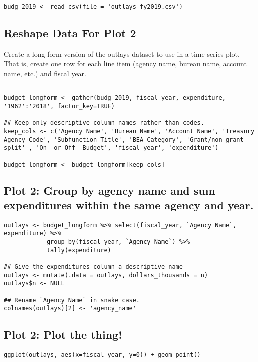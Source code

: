 \documentclass[]{article}
\begin{document}
\begin{verbatim}
budg_2019 <- read_csv(file = 'outlays-fy2019.csv')
\end{verbatim}

\hypertarget{reshape-data-for-plot-2}{%
\subsection{Reshape Data For Plot 2}\label{reshape-data-for-plot-2}}

Create a long-form version of the outlays dataset to use in a
time-series plot. That is, create one row for each line item (agency
name, bureau name, account name, etc.) and fiscal year.

\begin{verbatim}

budget_longform <- gather(budg_2019, fiscal_year, expenditure, '1962':'2018', factor_key=TRUE)

## Keep only descriptive column names rather than codes. 
keep_cols <- c('Agency Name', 'Bureau Name', 'Account Name', 'Treasury Agency Code', 'Subfunction Title', 'BEA Category', 'Grant/non-grant split' , 'On- or Off- Budget', 'fiscal_year', 'expenditure')

budget_longform <- budget_longform[keep_cols]
\end{verbatim}

\hypertarget{plot-2-group-by-agency-name-and-sum-expenditures-within-the-same-agency-and-year.}{%
\subsection{Plot 2: Group by agency name and sum expenditures within the
same agency and
year.}\label{plot-2-group-by-agency-name-and-sum-expenditures-within-the-same-agency-and-year.}}

\begin{verbatim}
outlays <- budget_longform %>% select(fiscal_year, `Agency Name`, expenditure) %>%
            group_by(fiscal_year, `Agency Name`) %>%
            tally(expenditure)

## Give the expenditures column a descriptive name          
outlays <- mutate(.data = outlays, dollars_thousands = n)
outlays$n <- NULL

## Rename `Agency Name` in snake case.
colnames(outlays)[2] <- 'agency_name'
\end{verbatim}

\hypertarget{plot-2-plot-the-thing}{%
\subsection{Plot 2: Plot the thing!}\label{plot-2-plot-the-thing}}

\begin{verbatim}
ggplot(outlays, aes(x=fiscal_year, y=0)) + geom_point()
\end{verbatim}
\end{document}
